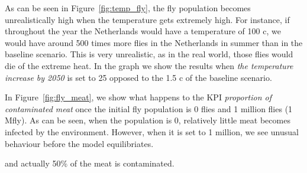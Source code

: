 As can be seen in Figure~\ref{fig:temp_fly}, the fly population becomes unrealistically high when the temperature gets extremely high. For instance, if throughout the year the Netherlands would have a temperature of 100 \degree c, we would have around 500 times more flies in the Netherlands in summer than in the baseline scenario. This is very unrealistic, as in the real world, those flies would die of the extreme heat. In the graph we show the results when \textit{the temperature increase by 2050} is set to 25 opposed to the 1.5 \degree c of the baseline scenario.

In Figure~\ref{fig:fly_meat}, we show what happens to the KPI \textit{proportion of contaminated meat} once the initial fly population is 0 flies and 1 million flies (1 Mfly). As can be seen, when the population is 0, relatively little meat becomes infected by the environment. However, when it is set to 1 million, we see unusual behaviour before the model equilibriates. 

and actually 50\% of the meat is contaminated.

{\color{pink}{should these images be adjusted to reflect the time horizon we're interested in?}}


